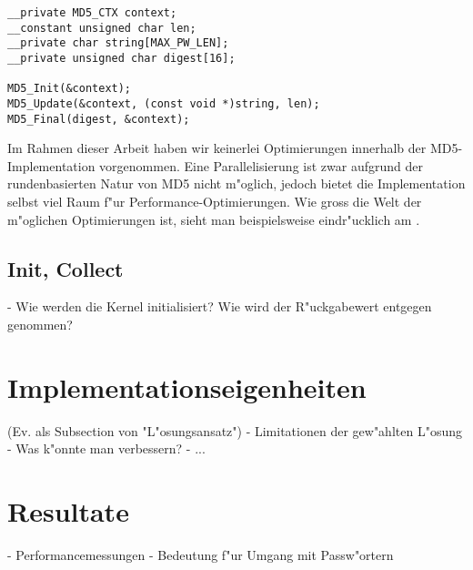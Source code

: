 \begin{refsection}
\begin{small}
\begin{verbatim}
__private MD5_CTX context;
__constant unsigned char len;
__private char string[MAX_PW_LEN];
__private unsigned char digest[16];

MD5_Init(&context);
MD5_Update(&context, (const void *)string, len);
MD5_Final(digest, &context);
\end{verbatim}
\end{small}

Im Rahmen dieser Arbeit haben wir keinerlei Optimierungen innerhalb der
MD5-Implementation vorgenommen. Eine Parallelisierung ist zwar aufgrund der
rundenbasierten Natur von MD5 nicht m"oglich, jedoch bietet die Implementation
selbst viel Raum f"ur Performance-Optimierungen. Wie gross die Welt der
m"oglichen Optimierungen ist, sieht man beispielsweise eindr"ucklich am
 \cite{crypto:nvidia_bestpractices}.

\subsection{Init, Collect}

- Wie werden die Kernel initialisiert? Wie wird der R"uckgabewert entgegen
genommen?

\section{Implementationseigenheiten}

(Ev. als Subsection von "L"osungsansatz")
- Limitationen der gew"ahlten L"osung
- Was k"onnte man verbessern?
- ...

\section{Resultate}

- Performancemessungen
- Bedeutung f"ur Umgang mit Passw"ortern

\printbibliography[heading=subbibliography]
\end{refsection}

